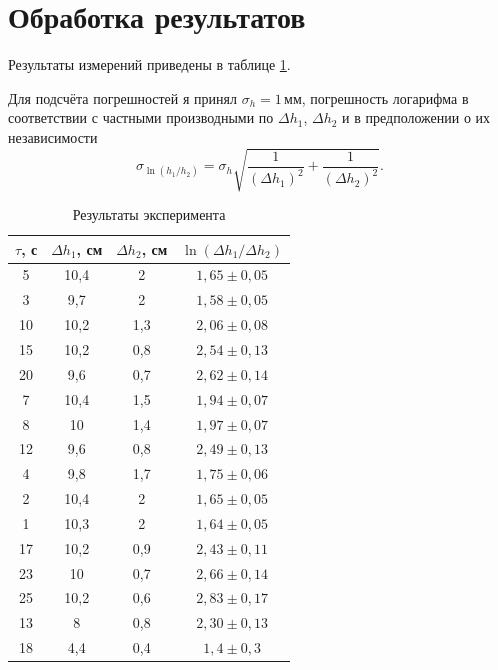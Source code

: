 \documentclass[12pt]{article}
\begin{document}
	\section*{Обработка результатов}
	
	Результаты измерений приведены в таблице \ref{table:results}.
	
	Для подсчёта погрешностей я принял $\sigma_h=1\,\text{мм}$, погрешность логарифма в соответствии с частными производными по $\Delta h_1$, $\Delta h_2$ и в предположении о их независимости
	\begin{equation}
	\label{eq:s_log}
	\sigma_{\ln \left( h_1/h_2 \right)}=\sigma_h \sqrt{\frac{1}{\left( \Delta h_1 \right)^2} + \frac{1}{\left( \Delta h_2 \right)^2}}.
	\end{equation}
	
	\begin{table}[h!]
	\caption{Результаты эксперимента}
	\label{table:results}
	\begin{center}
	\begin{tabular}{|c|c|c|c|}
	\hline
	$\tau$, с & $\Delta h_1$, см & $\Delta h_2$, см & $\ln \left( \Delta h_1/ \Delta h_2 \right)$ \\
	\hline
	5 & 10{,}4 & 2 & $1{,}65\pm 0{,}05$ \\
	3 & 9{,}7 & 2 & $1{,}58\pm 0{,}05$ \\
	10 & 10{,}2 & 1{,}3 & $2{,}06\pm 0{,}08$ \\
	15 & 10{,}2 & 0{,}8 & $2{,}54\pm 0{,}13$ \\
	20 & 9{,}6 & 0{,}7 & $2{,}62\pm 0{,}14$ \\
	7 & 10{,}4 & 1{,}5 & $1{,}94\pm 0{,}07$ \\
	8 & 10 & 1{,}4 & $1{,}97\pm 0{,}07$ \\
	12 & 9{,}6 & 0{,}8 & $2{,}49\pm 0{,}13$ \\
	4 & 9{,}8 & 1{,}7 & $1{,}75\pm 0{,}06$ \\
	2 & 10{,}4 & 2 & $1{,}65\pm 0{,}05$ \\
	1 & 10{,}3 & 2 & $1{,}64\pm 0{,}05$ \\
	17 & 10{,}2 & 0{,}9 & $2{,}43\pm 0{,}11$ \\
	23 & 10 & 0{,}7 & $2{,}66\pm 0{,}14$ \\
	25 & 10{,}2 & 0{,}6 & $2{,}83\pm 0{,}17$ \\
	13 & 8 & 0{,}8 & $2{,}30\pm 0{,}13$ \\
	18 & 4{,}4 & 0{,}4 & $1{,}4\pm 0{,}3$ \\
	\hline
	\end{tabular}
	\end{center}
	\end{table}
	
\end{document}
